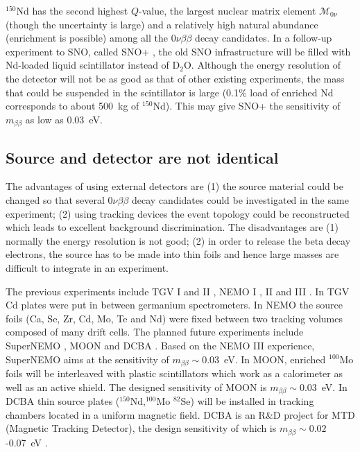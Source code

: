 $^{150}$Nd has the second highest $Q$-value, the largest nuclear
matrix element $\mathcal{M}_{0\nu}$ (though the uncertainty is large)
and a relatively high natural abundance (enrichment is possible) among
all the $0\nu\beta\beta$ decay candidates. In a follow-up experiment
to SNO, called SNO+ \cite{Zub07}, the old SNO infrastructure will be
filled with Nd-loaded liquid scintillator instead of
D$_{2}$O. Although the energy resolution of the detector will not be
as good as that of other existing experiments, the mass that could be
suspended in the scintillator is large (0.1\% load of enriched Nd
corresponds to about 500~kg of $^{150}$Nd). This may give SNO+ the
sensitivity of $m_{\beta\beta}$ as low as 0.03~eV.

\subsection{Source and  detector are not identical}
\label{sec:exp:sued}
The advantages of using external detectors are (1) the source material
could be changed so that several $0\nu\beta\beta$ decay candidates
could be investigated in the same experiment; (2) using tracking
devices the event topology could be reconstructed which leads to
excellent background discrimination. The disadvantages are (1)
normally the energy resolution is not good; (2) in order to release
the beta decay electrons, the source has to be made into thin foils
and hence large masses are difficult to integrate in an experiment.

The previous experiments include TGV I and II \cite{Ste98, Ste00,
Ste06}, NEMO I \cite{Das91}, II \cite{Arn95} and III \cite{Arn05,
Arn07}. In TGV Cd plates were put in between germanium spectrometers.
In NEMO the source foils (Ca, Se, Zr, Cd, Mo, Te and Nd) were fixed
between two tracking volumes composed of many drift cells. The planned
future experiments include SuperNEMO \cite{Sne08}, MOON \cite{Nak06}
and DCBA \cite{Ish05}. Based on the NEMO III experience, SuperNEMO
aims at the sensitivity of $m_{\beta\beta} \sim 0.03$~eV. In MOON,
enriched $^{100}$Mo foils will be interleaved with plastic
scintillators which work as a calorimeter as well as an active shield.
The designed sensitivity of MOON is $m_{\beta\beta} \sim 0.03$~eV. In
DCBA thin source plates ($^{150}$Nd,$^{100}$Mo $^{82}$Se) will be
installed in tracking chambers located in a uniform magnetic
field. DCBA is an R\&D project for MTD (Magnetic Tracking Detector),
the design sensitivity of which is $m_{\beta\beta} \sim
0.02$-0.07~eV \cite{Ish07}.

